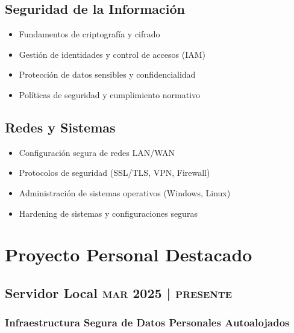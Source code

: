 \documentclass{article}
\newcommand{\rside}[1]{\hfill \normalfont\scshape\MakeLowercase{#1}}
\begin{document}
\begin{minipage}[t]{0.48\textwidth}

  \subsection{\faFileCode\enspace Seguridad de la Información}
  \begin{itemize}
    \item Fundamentos de criptografía y cifrado
    \item Gestión de identidades y control de accesos (IAM)
    \item Protección de datos sensibles y confidencialidad
    \item Políticas de seguridad y cumplimiento normativo
  \end{itemize}

  \subsection{\faServer\enspace Redes y Sistemas}
  \begin{itemize}
    \item Configuración segura de redes LAN/WAN
    \item Protocolos de seguridad (SSL/TLS, VPN, Firewall)
    \item Administración de sistemas operativos (Windows, Linux)
    \item Hardening de sistemas y configuraciones seguras

  \end{itemize}

\end{minipage}

\section{\faRocket\enspace Proyecto Personal Destacado}

\subsection{Servidor Local \rside{Mar 2025 | Presente}}
\subsubsection{Infraestructura Segura de Datos Personales Autoalojados}
\end{document}
